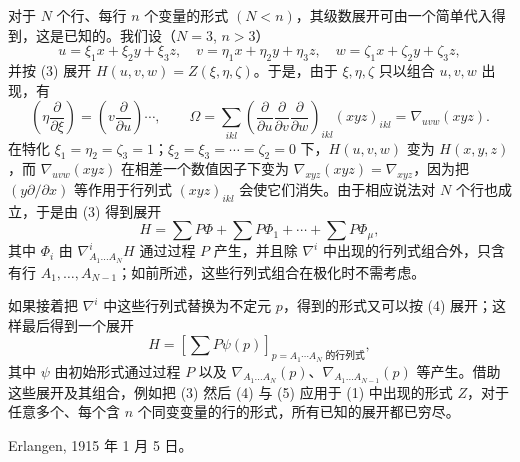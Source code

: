 对于 $N$ 个行、每行 $n$ 个变量的形式 $(N<n)$，其级数展开可由一个简单代入得到，这是已知的。我们设（$N=3$, $n>3$）
\[
  u=\xi_1x+\xi_2y+\xi_3z,
  \quad v=\eta_1x+\eta_2y+\eta_3z,
  \quad w=\zeta_1x+\zeta_2y+\zeta_3z,
\]
并按 (3) 展开 $H(u,v,w)=Z(\xi,\eta,\zeta)$。于是，由于 $\xi,\eta,\zeta$ 只以组合 $u,v,w$ 出现，有
\[
  \left(\eta\frac{\partial}{\partial \xi}\right)=
  \left(v\frac{\partial}{\partial u}\right)\cdots,
  \qquad
  \Omega=\sum_{ikl}\left(\frac{\partial}{\partial u}
  \frac{\partial}{\partial v}
  \frac{\partial}{\partial w}\right)_{ikl}(xyz)_{ikl}
  =\nabla_{uvw}(xyz).
\]
在特化 $\xi_1=\eta_2=\zeta_3=1$；$\xi_2=\xi_3=\cdots=\zeta_2=0$ 下，$H(u,v,w)$ 变为 $H(x,y,z)$，而 $\nabla_{uvw}(xyz)$ 在相差一个数值因子下变为 $\nabla_{xyz}(xyz)=\nabla_{xyz}$，因为把 $(y\partial/\partial x)$ 等作用于行列式 $(xyz)_{ikl}$ 会使它们消失。由于相应说法对 $N$ 个行也成立，于是由 (3) 得到展开
\begin{equation}
  H=\sum P\Phi+\sum P\Phi_1+\cdots+\sum P\Phi_\mu,
\tag{4}
\end{equation}
其中 $\Phi_i$ 由 $\nabla^i_{A_1\ldots A_N}H$ 通过过程 $P$ 产生，并且除 $\nabla^i$ 中出现的行列式组合外，只含有行 $A_1,\ldots,A_{N-1}$；如前所述，这些行列式组合在极化时不需考虑。

如果接着把 $\nabla^i$ 中这些行列式替换为不定元 $p$，得到的形式又可以按 (4) 展开；这样最后得到一个展开
\begin{equation}
  H=\left[\sum P\psi(p)\right]_{p=\text{$A_1\cdots A_N$ 的行列式}},
\tag{5}
\end{equation}
其中 $\psi$ 由初始形式通过过程 $P$ 以及 $\nabla_{A_1\ldots A_N}(p)$、$\nabla_{A_1\ldots A_{N-1}}(p)$ 等产生。借助这些展开及其组合，例如把 (3) 然后 (4) 与 (5) 应用于 (1) 中出现的形式 $Z$，对于任意多个、每个含 $n$ 个同变变量的行的形式，所有已知的展开都已穷尽。

Erlangen, 1915 年 1 月 5 日。
